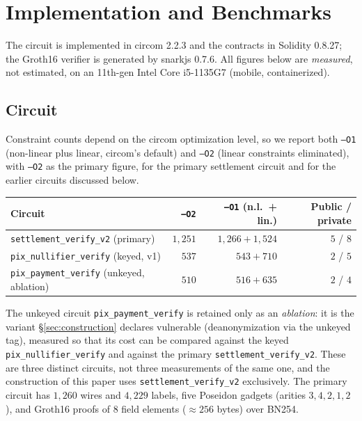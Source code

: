 \documentclass[11pt]{article}
\newcommand{\code}[1]{\texttt{#1}}
\begin{document}
\section{Implementation and Benchmarks}
\label{sec:impl}

The circuit is implemented in circom 2.2.3 and the contracts in Solidity
0.8.27; the Groth16 verifier is generated by snarkjs 0.7.6. All figures below
are \emph{measured}, not estimated, on an 11th-gen Intel Core i5-1135G7
(mobile, containerized).

\subsection{Circuit}
Constraint counts depend on the circom optimization level, so we report both
\code{--O1} (non-linear plus linear, circom's default) and \code{--O2} (linear
constraints eliminated), with \code{--O2} as the primary figure, for the
primary settlement circuit and for the earlier circuits discussed below.

\begin{center}
\small
\begin{tabular}{@{}lrrr@{}}
\toprule
\textbf{Circuit} & \textbf{\code{--O2}} & \textbf{\code{--O1} (n.l.\ + lin.)} & \textbf{Public / private} \\
\midrule
\code{settlement\_verify\_v2} (primary) & $1{,}251$ & $1{,}266 + 1{,}524$ & $5$ / $8$ \\
\code{pix\_nullifier\_verify} (keyed, v1)    & $537$      & $543 + 710$        & $2$ / $5$ \\
\code{pix\_payment\_verify} (unkeyed, ablation) & $510$ & $516 + 635$   & $2$ / $4$ \\
\bottomrule
\end{tabular}
\end{center}

\noindent The unkeyed circuit \code{pix\_payment\_verify} is retained only as an
\emph{ablation}: it is the variant \S\ref{sec:construction} declares vulnerable
(deanonymization via the unkeyed tag), measured so that its cost can be
compared against the keyed \code{pix\_nullifier\_verify} and against the
primary \code{settlement\_verify\_v2}. These are three distinct circuits, not
three measurements of the same one, and the construction of this paper uses
\code{settlement\_verify\_v2} exclusively. The primary circuit has $1{,}260$
wires and $4{,}229$ labels, five Poseidon gadgets (arities $3,4,2,1,2$), and
Groth16 proofs of $8$ field elements ($\approx 256$ bytes) over BN254.
\end{document}
